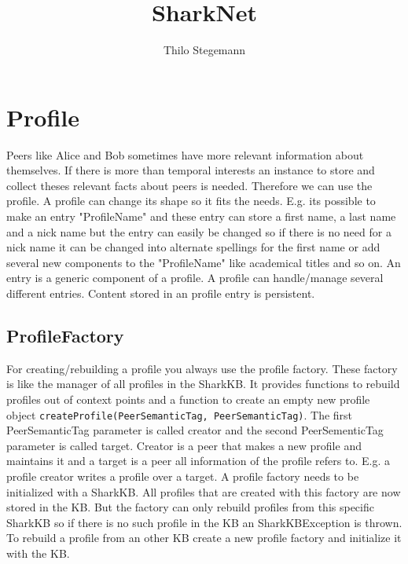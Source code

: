 \documentclass[12pt]{article}
\begin{document}
\title{SharkNet}
\maketitle
\author{Thilo Stegemann}
\section{Profile}
\label{sec:knowledgePorts:Profile}
Peers like Alice and Bob sometimes have more relevant information about themselves. If there is more than temporal interests an instance to store and collect theses relevant facts about peers is needed. Therefore we can use the profile. A profile can change its shape so it fits the needs. E.g. its possible to make an entry "ProfileName" and these entry can store a first name, a last name and a nick name but the entry can easily be changed so if there is no need for a nick name it can be changed into alternate spellings for the first name or add several new components to the "ProfileName" like academical titles and so on. 
An entry is a generic component of a profile. A profile can handle/manage several different entries. Content stored in an profile entry is persistent. 

\subsection{ProfileFactory}
For creating/rebuilding a profile you always use the profile factory. These factory is like the manager of all profiles in the SharkKB. It provides functions to rebuild profiles out of context points and a function to create an empty new profile object {\tt createProfile(PeerSemanticTag, PeerSemanticTag)}. The first PeerSemanticTag parameter is called creator and the second PeerSementicTag parameter is called target. Creator is a peer that makes a new profile and maintains it and a target is a peer all information of the profile refers to. E.g. a profile creator writes a profile over a target. A profile factory needs to be initialized with a SharkKB. All profiles that are created with this factory are now stored in the KB. But the factory can only rebuild profiles from this specific SharkKB so if there is no such profile in the KB an SharkKBException is thrown. To rebuild a profile from an other KB create a new profile factory and initialize it with the KB.
\end{document}
